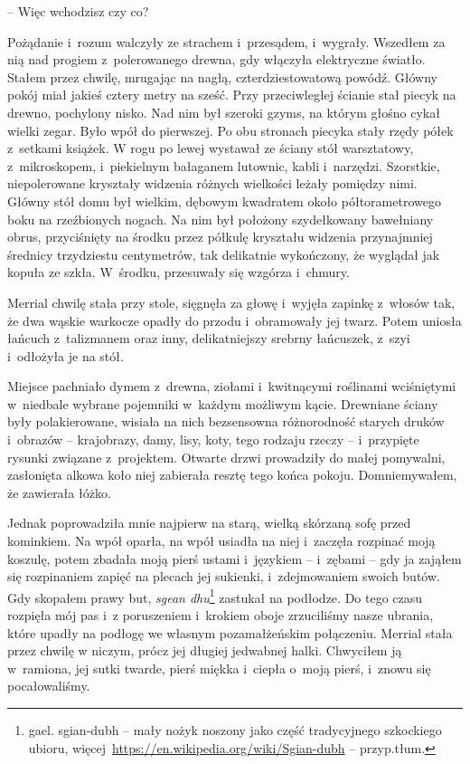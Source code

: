 \documentclass[oneside,polish,11pt,sfheadings]{mwbk}
\begin{document}
-- Więc wchodzisz czy co?

Pożądanie i~rozum walczyły ze strachem i~przesądem, i~wygrały. Wszedłem
za nią nad progiem z~polerowanego drewna, gdy włączyła elektryczne
światło. Stałem przez chwilę, mrugając na nagłą, czterdziestowatową
powódź. Główny pokój miał jakieś cztery metry na sześć. Przy
przeciwległej ścianie stał piecyk na drewno, pochylony nisko. Nad nim
był szeroki gzyms, na którym głośno cykał wielki zegar. Było wpół do
pierwszej. Po obu stronach piecyka stały rzędy półek z~setkami książek.
W rogu po lewej wystawał ze ściany stół warsztatowy, z~mikroskopem, i~piekielnym bałaganem lutownic, kabli i~narzędzi. Szorstkie,
niepolerowane kryształy widzenia różnych wielkości leżały pomiędzy nimi.
Główny stół domu był wielkim, dębowym kwadratem około półtorametrowego
boku na rzeźbionych nogach. Na nim był położony szydełkowany bawełniany
obrus, przyciśnięty na środku przez półkulę kryształu widzenia
przynajmniej średnicy trzydziestu centymetrów, tak delikatnie
wykończony, że wyglądał jak kopuła ze szkła. W~środku, przesuwały się
wzgórza i~chmury.

Merrial chwilę stała przy stole, sięgnęła za głowę i~wyjęła zapinkę z~włosów tak, że dwa wąskie warkocze opadły do przodu i~obramowały jej
twarz. Potem uniosła łańcuch z~talizmanem oraz inny, delikatniejszy
srebrny łańcuszek, z~szyi i~odłożyła je na stół.

Miejsce pachniało dymem z~drewna, ziołami i~kwitnącymi roślinami
wciśniętymi w~niedbale wybrane pojemniki w~każdym możliwym kącie.
Drewniane ściany były polakierowane, wisiała na nich bezsensowna
różnorodność starych druków i~obrazów -- krajobrazy, damy, lisy, koty,
tego rodzaju rzeczy -- i~przypięte rysunki związane z~projektem. Otwarte
drzwi prowadziły do małej pomywalni, zasłonięta alkowa koło niej
zabierała resztę tego końca pokoju. Domniemywałem, że zawierała łóżko.

Jednak poprowadziła mnie najpierw na starą, wielką skórzaną sofę przed
kominkiem. Na wpół oparła, na wpół usiadła na niej i~zaczęła rozpinać
moją koszulę, potem zbadała moją pierś ustami i~językiem -- i~zębami -- gdy ja zająłem się rozpinaniem zapięć na plecach jej sukienki, i~zdejmowaniem swoich butów. Gdy skopałem prawy but, \textit{sgean dhu}\footnote{
gael. sgian-dubh -- mały nożyk noszony jako część
tradycyjnego szkockiego ubioru,
więcej~\url{https://en.wikipedia.org/wiki/Sgian-dubh} -- przyp.tłum.} zastukał na podłodze. Do tego czasu rozpięła mój pas i~z poruszeniem i~krokiem oboje zrzuciliśmy nasze ubrania, które upadły na
podłogę we własnym pozamałżeńskim połączeniu. Merrial stała przez chwilę
w niczym, prócz jej długiej jedwabnej halki. Chwyciłem ją w~ramiona, jej
sutki twarde, pierś miękka i~ciepła o~moją pierś, i~znowu się
pocałowaliśmy.
\end{document}
